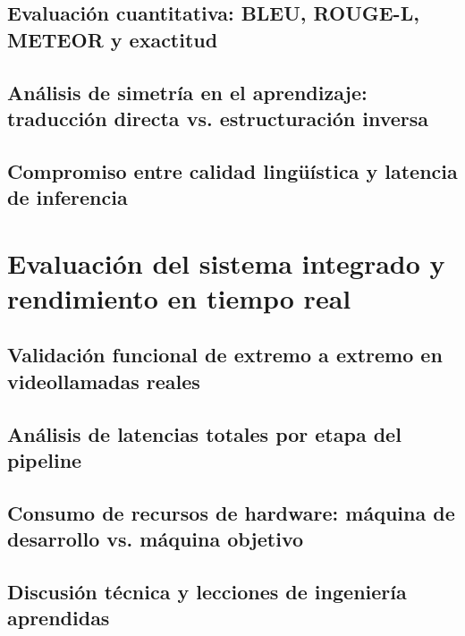 \subsection{Evaluación cuantitativa: BLEU, ROUGE-L, METEOR y exactitud}
\subsection{Análisis de simetría en el aprendizaje: traducción directa vs. estructuración inversa}
\subsection{Compromiso entre calidad lingüística y latencia de inferencia}

\section{Evaluación del sistema integrado y rendimiento en tiempo real}
\subsection{Validación funcional de extremo a extremo en videollamadas reales}
\subsection{Análisis de latencias totales por etapa del pipeline}
\subsection{Consumo de recursos de hardware: máquina de desarrollo vs. máquina objetivo}
\subsection{Discusión técnica y lecciones de ingeniería aprendidas}

